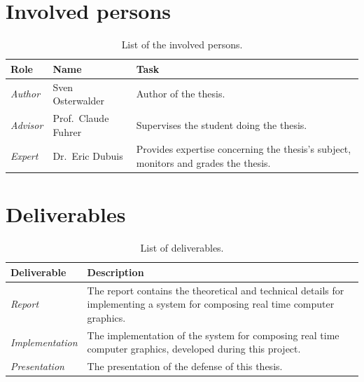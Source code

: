 \documentclass[%
    a4paper,    %
    justified,  %
    nobib,      %
    openany     %
]{tufte-book}
\makeatletter
\renewcommand{\label}[1]{\@tufte@label{##1}}%
\makeatother
\begin{document}
\section{Involved persons}
\label{sec:involved_persons}

\begin{table}[h]
  \caption{List of the involved persons.}
  \begin{tabularx}{\textwidth}{llX}
    \toprule
    \textbf{Role} & \textbf{Name} & \textbf{Task} \\
    \midrule
    \textit{Author}  & Sven Osterwalder\protect\footnotemark[1]{} & Author of the thesis.\\
    \textit{Advisor} & Prof.\ Claude Fuhrer\protect\footnotemark[2]{} & Supervises the student doing the thesis.\\
    \textit{Expert}  & Dr.\ Eric Dubuis\protect\footnotemark[3]{}     & Provides expertise concerning the thesis's subject, monitors and grades the thesis.\\
    \bottomrule
  \end{tabularx}
\end{table}

\newpage{}

\section{Deliverables}
\label{sec:deliverables}

\begin{table}[h]
  \caption{List of deliverables.}
  \begin{tabularx}{\textwidth}{lX}
    \toprule
    \textbf{Deliverable}    & \textbf{Description}                            \\
    \midrule
    \textit{Report}         & The report contains the theoretical and technical details for
    implementing a system for composing real time computer graphics.          \\
    \midrule
    \textit{Implementation} & The implementation of the system for composing real time
    computer graphics, developed during this project.                         \\
    \midrule
    \textit{Presentation}   & The presentation of the defense of this thesis. \\
    \bottomrule
  \end{tabularx}
\end{table}
\end{document}
